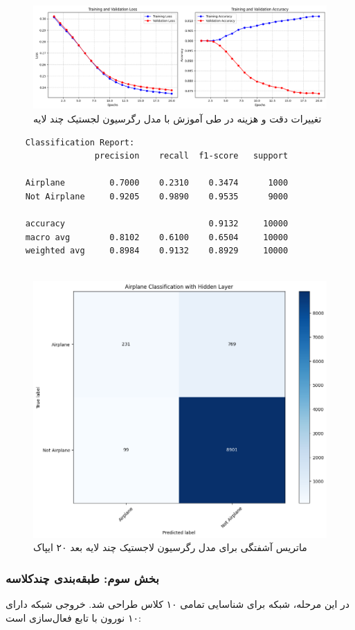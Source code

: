 \begin{figure}[h]
	\centering
	\includegraphics[width=0.7\linewidth]{images/task2-1}
	\caption{تغییرات دقت و هزینه در طی آموزش با مدل رگرسیون لجستیک چند لایه}
	\label{fig:task2-1}
\end{figure}


\begin{lstlisting}
	Classification Report:
	              precision    recall  f1-score   support
	
	Airplane         0.7000    0.2310    0.3474      1000
	Not Airplane     0.9205    0.9890    0.9535      9000
	
	accuracy                             0.9132     10000
	macro avg        0.8102    0.6100    0.6504     10000
	weighted avg     0.8984    0.9132    0.8929     10000
	
\end{lstlisting}

\begin{figure}[h]
	\centering
	\includegraphics[width=0.5\linewidth]{images/task2-3}
	\caption{ماتریس آشفتگی برای مدل رگرسیون لاجستیک چند لایه بعد ۲۰ ایپاک}
	\label{fig:task2-3}
\end{figure}




	\subsubsection{بخش سوم: طبقه‌بندی چندکلاسه}
	
	در این مرحله، شبکه برای شناسایی تمامی ۱۰ کلاس  طراحی شد. خروجی شبکه دارای ۱۰ نورون با تابع فعال‌سازی  است:
	
